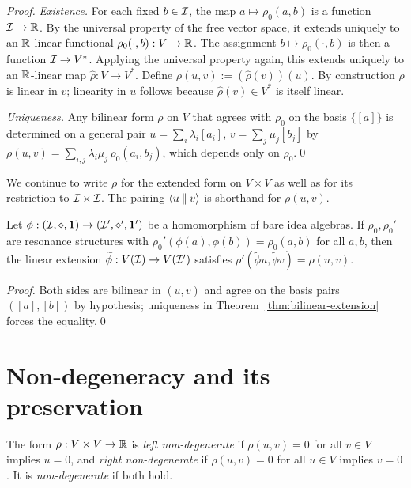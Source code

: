 \begin{proof}
\emph{Existence.} For each fixed $b\in\mathcal{I}$, the map
$a\mapsto\rho_0(a,b)$ is a function $\mathcal{I}\to\mathbb{R}$. By the universal
property of the free vector space, it extends uniquely to an $\mathbb{R}$-linear
functional $\rho_0(\cdot,b):V\to\mathbb{R}$. The assignment
$b\mapsto\rho_0(\cdot,b)$ is then a function $\mathcal{I}\to V^*$. Applying the
universal property again, this extends uniquely to an $\mathbb{R}$-linear map
$\widehat\rho:V\to V^*$. Define $\rho(u,v):=(\widehat\rho(v))(u)$. By
construction $\rho$ is linear in $v$; linearity in $u$ follows because
$\widehat\rho(v)\in V^*$ is itself linear.

\emph{Uniqueness.} Any bilinear form $\rho$ on $V$ that agrees with $\rho_0$
on the basis $\{[a]\}$ is determined on a general pair
$u=\sum_i \lambda_i[a_i]$, $v=\sum_j \mu_j[b_j]$ by
$\rho(u,v)=\sum_{i,j}\lambda_i\mu_j\,\rho_0(a_i,b_j)$, which depends only on
$\rho_0$.\qed
\end{proof}

\begin{remark}[Notation]
We continue to write $\rho$ for the extended form on $V\times V$ as well as
for its restriction to $\mathcal{I}\times\mathcal{I}$. The pairing $\langle u \mathbin{\Vert} v \rangle$ is
shorthand for $\rho(u,v)$.
\end{remark}

\begin{proposition}[Functoriality]\label{prop:functorial}
Let $\phi:(\mathcal{I},\mathbin{\diamond},\mathbf{1})\to(\mathcal{I}',\mathbin{\diamond}',\mathbf{1}')$ be a homomorphism of bare
idea algebras. If $\rho_0,\rho_0'$ are resonance structures with
$\rho_0'(\phi(a),\phi(b))=\rho_0(a,b)$ for all $a,b$, then the linear
extension $\widetilde\phi:V(\mathcal{I})\to V(\mathcal{I}')$ satisfies
$\rho'(\widetilde\phi u,\widetilde\phi v)=\rho(u,v)$.
\end{proposition}
\begin{proof}
Both sides are bilinear in $(u,v)$ and agree on the basis pairs
$([a],[b])$ by hypothesis; uniqueness in
Theorem~\ref{thm:bilinear-extension} forces the equality.\qed
\end{proof}

\section{Non-degeneracy and its preservation}\label{sec:nondeg}

\begin{definition}\label{def:nondeg}
The form $\rho:V\times V\to\mathbb{R}$ is \emph{left non-degenerate} if
$\rho(u,v)=0$ for all $v\in V$ implies $u=0$, and \emph{right
non-degenerate} if $\rho(u,v)=0$ for all $u\in V$ implies $v=0$. It is
\emph{non-degenerate} if both hold.
\end{definition}

